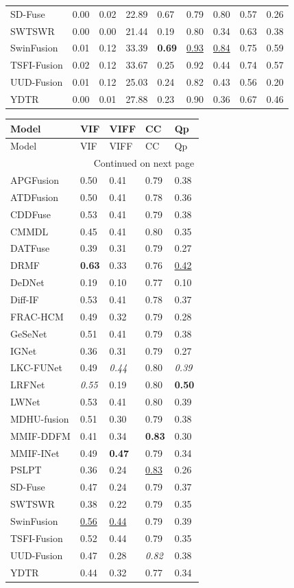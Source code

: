 {\begin{longtable}{lllllllll}
SD-Fuse & 0.00 & 0.02 & 22.89 & 0.67 & 0.79 & 0.80 & 0.57 & 0.26 \\
SWTSWR & 0.00 & 0.00 & 21.44 & 0.19 & 0.80 & 0.34 & 0.63 & 0.38 \\
SwinFusion & 0.01 & 0.12 & 33.39 & \textbf{0.69} & \underline{0.93} & \underline{0.84} & 0.75 & 0.59 \\
TSFI-Fusion & 0.02 & 0.12 & 33.67 & 0.25 & 0.92 & 0.44 & 0.74 & 0.57 \\
UUD-Fusion & 0.01 & 0.12 & 25.03 & 0.24 & 0.82 & 0.43 & 0.56 & 0.20 \\
YDTR & 0.00 & 0.01 & 27.88 & 0.23 & 0.90 & 0.36 & 0.67 & 0.46 \\
\end{longtable}
}

{\small
\begin{longtable}{lllll}
\toprule
Model & VIF & VIFF & CC & Qp \\
\midrule
\endfirsthead
\toprule
Model & VIF & VIFF & CC & Qp \\
\midrule
\endhead
\midrule
\multicolumn{5}{r}{Continued on next page} \\
\midrule
\endfoot
\bottomrule
\endlastfoot
APGFusion & 0.50 & 0.41 & 0.79 & 0.38 \\
ATDFusion & 0.50 & 0.41 & 0.78 & 0.36 \\
CDDFuse & 0.53 & 0.41 & 0.79 & 0.38 \\
CMMDL & 0.45 & 0.41 & 0.80 & 0.35 \\
DATFuse & 0.39 & 0.31 & 0.79 & 0.27 \\
DRMF & \textbf{0.63} & 0.33 & 0.76 & \underline{0.42} \\
DeDNet & 0.19 & 0.10 & 0.77 & 0.10 \\
Diff-IF & 0.53 & 0.41 & 0.78 & 0.37 \\
FRAC-HCM & 0.49 & 0.32 & 0.79 & 0.28 \\
GeSeNet & 0.51 & 0.41 & 0.79 & 0.38 \\
IGNet & 0.36 & 0.31 & 0.79 & 0.27 \\
LKC-FUNet & 0.49 & \textit{0.44} & 0.80 & \textit{0.39} \\
LRFNet & \textit{0.55} & 0.19 & 0.80 & \textbf{0.50} \\
LWNet & 0.53 & 0.41 & 0.80 & 0.39 \\
MDHU-fusion & 0.51 & 0.30 & 0.79 & 0.38 \\
MMIF-DDFM & 0.41 & 0.34 & \textbf{0.83} & 0.30 \\
MMIF-INet & 0.49 & \textbf{0.47} & 0.79 & 0.34 \\
PSLPT & 0.36 & 0.24 & \underline{0.83} & 0.26 \\
SD-Fuse & 0.47 & 0.24 & 0.79 & 0.37 \\
SWTSWR & 0.38 & 0.22 & 0.79 & 0.35 \\
SwinFusion & \underline{0.56} & \underline{0.44} & 0.79 & 0.39 \\
TSFI-Fusion & 0.52 & 0.44 & 0.79 & 0.35 \\
UUD-Fusion & 0.47 & 0.28 & \textit{0.82} & 0.38 \\
YDTR & 0.44 & 0.32 & 0.77 & 0.34 \\
\end{longtable}
}

